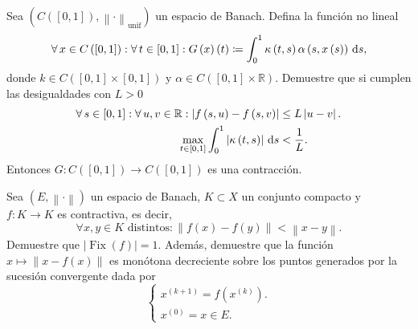 \begin{solutionordottedlines}
\end{solutionordottedlines}

\question

Sea
\begin{math}
  \left(
    C\left(\left[0,1\right]\right),
    {\left\|\cdot\right\|}_{\text{unif}}
  \right)
\end{math}
un espacio de Banach.
Defina la función no lineal
\begin{equation*}
  \forall x\in C\left(\left[0,1\right]\right):
  \forall t\in[0,1]:
  G\left(x\right)\left(t\right)\coloneqq
  \int_{0}^{1}
  \kappa\left(t,s\right)
  \alpha\left(s,x\left(s\right)\right)\dl s,
\end{equation*}
donde $k\in C\left(\left[0,1\right]\times\left[0,1\right]\right)$ y
$\alpha\in C\left(\left[0,1\right]\times\mathbb{R}\right)$.
Demuestre que si cumplen las desigualdades con $L>0$
\begin{align*}
  \forall s\in\left[0,1\right]:
  \forall u,v\in\mathbb{R}:
  \left|f\left(s,u\right)-f\left(s,v\right)\right|&\leq
  L\left|u-v\right|.\\
  \max_{t\in\left[0,1\right]}
  \int_{0}^{1}
  \left|\kappa\left(t,s\right)\right|\dl s&<
  \frac{1}{L}.
\end{align*}
Entonces
\begin{math}
  G\colon C\left(\left[0,1\right]\right)\to
  C\left(\left[0,1\right]\right)
\end{math}
es una contracción.

\begin{solutionordottedlines}
\end{solutionordottedlines}

\question

Sea $\left(E,\left\|\cdot\right\|\right)$ un espacio de Banach,
$K\subset X$ un conjunto compacto y $f\colon K\to K$ es contractiva,
es decir,
\begin{equation*}
  \forall x,y\in K\text{ distintos}:
  \left\|f\left(x\right)-f\left(y\right)\right\|<
  \left\|x-y\right\|.
\end{equation*}
Demuestre que $\left|\operatorname{Fix}\left(f\right)\right|=1$.
Además, demuestre que la función
$x\longmapsto\left\|x-f\left(x\right)\right\|$ es monótona
decreciente sobre los puntos generados por la sucesión convergente
dada por
\begin{equation*}
  \left\{
    \begin{aligned}
      x^{\left(k+1\right)}=f\left(x^{\left(k\right)}\right).\\
      x^{\left(0\right)}=x\in E.
    \end{aligned}
    \right.
  \end{equation*}

